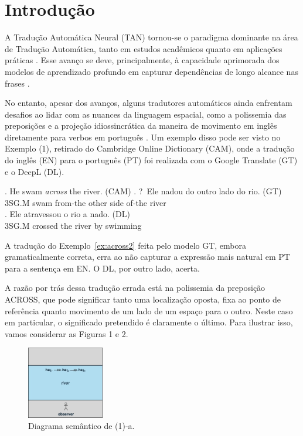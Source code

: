 \documentclass[a4paper, twocolumn, 11pt, twoside]{article}
\begin{document}


\section{Introdução}

A Tradução Automática Neural (TAN) tornou-se o paradigma dominante na área de Tradução Automática, tanto em estudos acadêmicos quanto em aplicações práticas \citep{dabre2020survey}. Esse avanço se deve, principalmente, à capacidade aprimorada dos modelos de aprendizado profundo em capturar dependências de longo alcance nas frases \citep{vaswani2017attention, yang2020survey}.

No entanto, apesar dos avanços, alguns tradutores automáticos ainda enfrentam desafios ao lidar com as nuances da linguagem espacial, como a polissemia das preposições e a projeção idiossincrática da maneira de movimento em inglês diretamente para verbos em português \citep{McCleary-Viotti-2004}. Um exemplo disso pode ser visto no Exemplo (1), retirado do Cambridge Online Dictionary (CAM), onde a tradução do inglês (EN) para o português (PT) foi realizada com o Google Translate (GT) e o DeepL (DL).

\footnotesize
  \ex. He swam \emph{across} the river. (CAM)\label{ex:across2}
  \ag. ?~Ele nadou do outro lado do rio. (GT) \\  
  3SG.M swam from-the other side of-the river\\ 
  \bg. Ele atravessou o rio a nado. (DL) \\ 
  3SG.M crossed the river by swimming\\
  \par
\normalsize
  
A tradução do Exemplo~\ref{ex:across2} feita pelo modelo GT, embora gramaticalmente correta, erra ao não capturar a expressão mais natural em PT para a sentença em EN. O DL, por outro lado, acerta.
  
A razão por trás dessa tradução errada está na polissemia da preposição ACROSS, que pode significar tanto uma localização oposta, fixa ao ponto de referência quanto movimento de um lado de um espaço para o outro. Neste caso em particular, o significado pretendido é claramente o último. Para ilustrar isso, vamos considerar as Figuras 1 e 2.

\begin{figure}[ht]
  \centering
  \includegraphics[width=0.3\textwidth]{aa-a-2.jpg}
  \caption{Diagrama semântico de (1)-a.}\label{fig:across-1a}
\end{figure}
\end{document}
